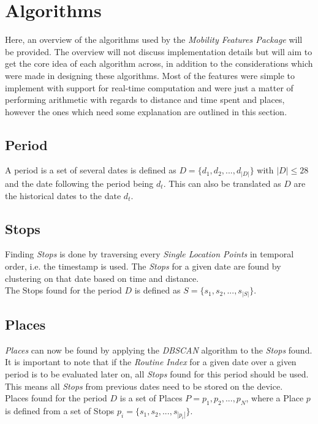 \section{Algorithms}
Here, an overview of the algorithms used by the \textit{Mobility Features Package} will be provided. The overview will not discuss implementation details but will aim to get the core idea of each algorithm across, in addition to the considerations which were made in designing these algorithms. Most of the features were simple to implement with support for real-time computation and were just a matter of performing arithmetic with regards to distance and time spent and places, however the ones which need some explanation are outlined in this section. 

\subsection{Period}
A period is a set of several dates is defined as $D = \{d_1, d_2, ..., d_{|D|}\}$ with $|D| \leq 28$ and the date following the period being $d_t$. This can also be translated as $D$ are the historical dates to the date $d_t$.\\

\subsection{Stops}
Finding \textit{Stops} is done by traversing every \textit{Single Location Points} in temporal order, i.e. the timestamp is used. The \textit{Stops} for a given date are found by clustering  on that date based on time and distance. \\

The Stops found for the period $D$ is defined as $S = \{s_1, s_2, ..., s_{|S|}\}$.\\

\subsection{Places}
\textit{Places} can now be found by applying the \textit{DBSCAN} algorithm to the \textit{Stops} found. It is important to note that if the \textit{Routine Index} for a given date over a given period is to be evaluated later on, all \textit{Stops} found for this period should be used. This means all \textit{Stops} from previous dates need to be stored on the device. \\

Places found for the period $D$ is a set of Places $P = {p_1, p_2, ..., p_N}$, where a Place $p$ is defined from a set of Stops $p_i = \{s_1, s_2, ..., s_{|p_i|}\}$.\\


